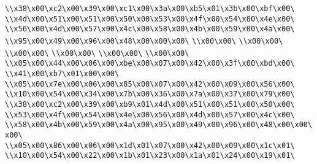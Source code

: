 \verb|\\x38\x00\xc2\x00\x39\x00\xc1\x00\x3a\x00\xb5\x01\x3b\x00\xbf\x00\|\newline
\verb|\\x4d\x00\x51\x00\x51\x00\x50\x00\x53\x00\x4f\x00\x54\x00\x4e\x00\|\newline
\verb|\\x56\x00\x4d\x00\x57\x00\x4c\x00\x58\x00\x4b\x00\x59\x00\x4a\x00\|\newline
\verb|\\x95\x00\x49\x00\x96\x00\x48\x00\x00\x00\|\newline
\verb|\\x00\x00\|\newline
\verb|\\x00\x00\|\newline
\verb|\\x00\x00\|\newline
\verb|\\x00\x00\|\newline
\verb|\\x00\x00\|\newline
\verb|\\x00\x00\|\newline
\verb|\\x05\x00\x44\x00\x06\x00\xbe\x00\x07\x00\x42\x00\x3f\x00\xbd\x00\|\newline
\verb|\\x41\x00\xb7\x01\x00\x00\|\newline
\verb|\\x05\x00\x7e\x00\x06\x00\x85\x00\x07\x00\x42\x00\x09\x00\x56\x00\|\newline
\verb|\\x10\x00\x54\x00\x34\x00\x7b\x00\x36\x00\x7a\x00\x37\x00\x79\x00\|\newline
\verb|\\x38\x00\xc2\x00\x39\x00\xb9\x01\x4d\x00\x51\x00\x51\x00\x50\x00\|\newline
\verb|\\x53\x00\x4f\x00\x54\x00\x4e\x00\x56\x00\x4d\x00\x57\x00\x4c\x00\|\newline
\verb|\\x58\x00\x4b\x00\x59\x00\x4a\x00\x95\x00\x49\x00\x96\x00\x48\x00\x00\x00\|\newline
\verb|\\x05\x00\x86\x00\x06\x00\x1d\x01\x07\x00\x42\x00\x09\x00\x1c\x01\|\newline
\verb|\\x10\x00\x54\x00\x22\x00\x1b\x01\x23\x00\x1a\x01\x24\x00\x19\x01\|\newline
